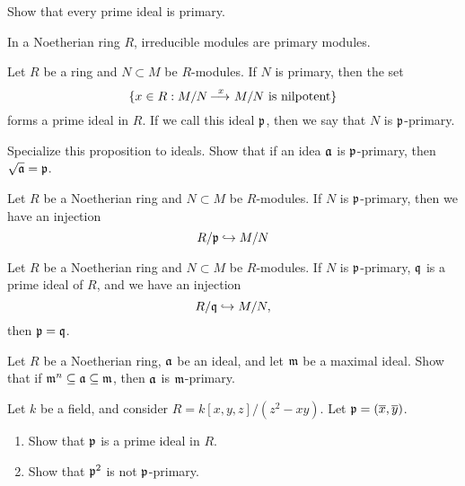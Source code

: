 \documentclass{ximera}
\begin{document}
\begin{exercise}
  Show that every prime ideal is primary.
\end{exercise}


\begin{theorem}
  In a Noetherian ring $R$, irreducible modules are primary modules.
\end{theorem}



\begin{proposition}
  Let $R$ be a ring and $N\subset M$ be $R$-modules. If $N$ is primary, then the set
  \[
  \{ x\in R : \text{$M/N\mathop{\longrightarrow\,}\limits^x M/N$ is nilpotent}\} 
  \]
  forms a prime ideal in $R$. If we call this ideal $\mathfrak{p}$, then we say
  that $N$ is $\mathfrak{p}$-primary.
\end{proposition}


\begin{exercise}
  Specialize this proposition to ideals. Show that if an idea $\mathfrak{a}$ is
  $\mathfrak{p}$-primary, then $\sqrt{\mathfrak{a}} = \mathfrak{p}$.
\end{exercise}

\begin{exercise}
  Let $R$ be a Noetherian ring and $N\subset M$ be $R$-modules. If $N$
  is $\mathfrak{p}$-primary, then we have an injection
  \[
  R/\mathfrak{p} \hookrightarrow M/N
  \]
\end{exercise}


\begin{exercise}
  Let $R$ be a Noetherian ring and $N\subset M$ be $R$-modules. If $N$
  is $\mathfrak{p}$-primary, $\mathfrak{q}$ is a prime ideal of $R$, and we have an
  injection
  \[
  R/\mathfrak{q} \hookrightarrow M/N,
  \]
  then $\mathfrak{p} = \mathfrak{q}$.
\end{exercise}

\begin{exercise}
  Let $R$ be a Noetherian ring, $\mathfrak{a}$ be an ideal, and let $\mathfrak{m}$ be a
  maximal ideal. Show that if $\mathfrak{m}^n \subseteq\mathfrak{a} \subseteq \mathfrak{m}$, then $\mathfrak{a}$
  is $\mathfrak{m}$-primary.
\end{exercise}

\begin{exercise}
  Let $k$ be a field, and consider $R=k[x,y,z]/(z^2-xy)$. Let $\mathfrak{p} = (\overline{x},\overline{y})$.
  \begin{enumerate}
  \item Show that $\mathfrak{p}$ is a prime ideal in $R$.
  \item Show that $\mathfrak{p}^2$ is not $\mathfrak{p}$-primary.
  \end{enumerate}
\end{exercise}
\end{document}
